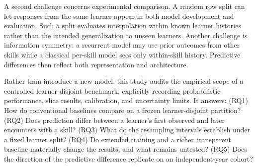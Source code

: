 \documentclass[11pt,a4paper]{article}
\begin{document}
A second challenge concerns experimental comparison. A random row split can let responses from the same learner appear in both model development and evaluation. Such a split evaluates interpolation within known learner histories rather than the intended generalization to unseen learners. Another challenge is information symmetry: a recurrent model may use prior outcomes from other skills while a classical per-skill model sees only within-skill history. Predictive differences then reflect both representation and architecture.

Rather than introduce a new model, this study audits the empirical scope of a controlled learner-disjoint benchmark, explicitly recording probabilistic performance, slice results, calibration, and uncertainty limits. It answers: (RQ1) How do conventional baselines compare on a frozen learner-disjoint partition? (RQ2) Does prediction differ between a learner's first observed and later encounters with a skill? (RQ3) What do the resampling intervals establish under a fixed learner split? (RQ4) Do extended training and a richer transparent baseline materially change the results, and what remains untested? (RQ5) Does the direction of the predictive difference replicate on an independent-year cohort?
\end{document}

